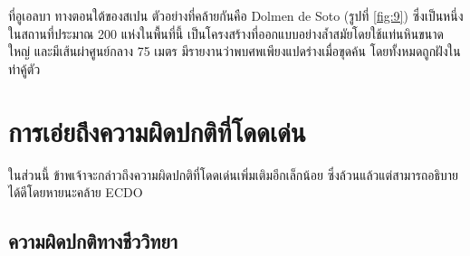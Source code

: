 \documentclass[10pt,twocolumn,letterpaper]{article}
\begin{document}
ที่อูเอลบา ทางตอนใต้ของสเปน ตัวอย่างที่คล้ายกันคือ Dolmen de Soto (รูปที่ \ref{fig:9}) ซึ่งเป็นหนึ่งในสถานที่ประมาณ 200 แห่งในพื้นที่นี้ \cite{72,32} เป็นโครงสร้างที่ออกแบบอย่างล้ำสมัยโดยใช้แท่นหินขนาดใหญ่ และมีเส้นผ่าศูนย์กลาง 75 เมตร มีรายงานว่าพบศพเพียงแปดร่างเมื่อขุดค้น โดยทั้งหมดถูกฝังในท่าคู้ตัว

\section{การเอ่ยถึงความผิดปกติที่โดดเด่น}

ในส่วนนี้ ข้าพเจ้าจะกล่าวถึงความผิดปกติที่โดดเด่นเพิ่มเติมอีกเล็กน้อย ซึ่งล้วนแล้วแต่สามารถอธิบายได้ดีโดยหายนะคล้าย ECDO

\subsection{ความผิดปกติทางชีววิทยา}
\end{document}
